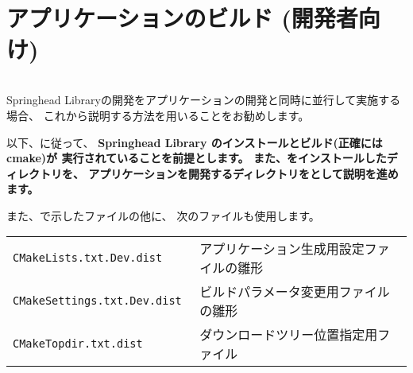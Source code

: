 \newpage
\section{アプリケーションのビルド (開発者向け)}
\label{sec:Application}
\parindent=0pt

\begin{center}
\begin{tabular}{l} \hline\hline
	\makebox[.95\linewidth][l]{%
		この章での説明は、Springhead Libraryの開発者に向けたものです。
	} \\\hline\hline
\end{tabular}\end{center}

\medskip
Springhead Libraryの開発をアプリケーションの開発と同時に並行して実施する場合、
これから説明する方法を用いることをお勧めします。


\medskip
以下、に従って、
\bf{Springhead Library のインストールとビルド(正確には cmake)が
実行されていることを前提とします。}
また、\SprLib をインストールしたディレクトリを\bf{\SprTop{}}、
アプリケーションを開発するディレクトリを\bf{\AppTop{}}として説明を進めます。

\bigskip
また、で示したファイルの他に、
次のファイルも使用します。

\begin{center}
\begin{tabular}{l@{\ \ ---\ \ }l}\hline
	\tt{CMakeLists.txt.Dev.dist} & アプリケーション生成用設定ファイルの雛形 \\
	\tt{CMakeSettings.txt.Dev.dist} & ビルドパラメータ変更用ファイルの雛形 \\
	\tt{CMakeTopdir.txt.dist} & ダウンロードツリー位置指定用ファイル \\\hline
\end{tabular}
\end{center}

